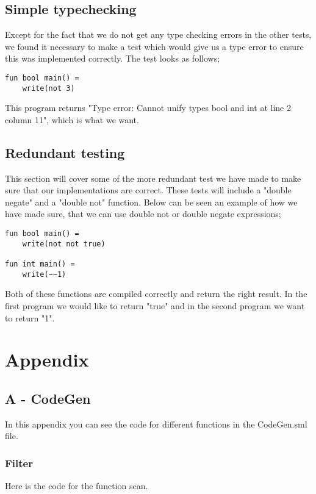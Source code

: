 \documentclass[12pt]{article}
\begin{document}
\subsection{Simple typechecking}
Except for the fact that we do not get any type checking errors in the other tests, we found it necessary to make a test which would give us a type error to ensure this was implemented correctly. The test looks as follows;
\begin{verbatim}
fun bool main() =
    write(not 3)
\end{verbatim}
This program returns "Type error: Cannot unify types bool and int at line 2 column 11", which is what we want.
\subsection{Redundant testing}
This section will cover some of the more redundant test we have made to make sure that our implementations are correct. These tests will include a "double negate" and a "double not" function. Below can be seen an example of how we have made sure, that we can use double not or double negate expressions;
\begin{verbatim}
fun bool main() =
    write(not not true)
    
fun int main() =
    write(~~1)
\end{verbatim}
Both of these functions are compiled correctly and return the right result. In the first program we would like to return "true" and in the second program we want to return "1".

\pagebreak

\section{Appendix}
\subsection{A - CodeGen}
In this appendix you can see the code for different functions in the CodeGen.sml file.

\subsubsection{Filter}
Here is the code for the function scan. 
\end{document}
